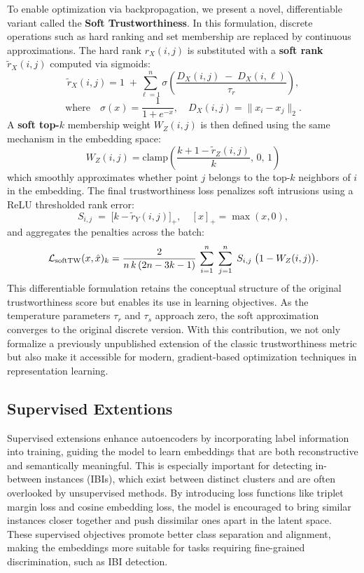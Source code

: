 To enable optimization via backpropagation, we present a novel, differentiable variant called the \textbf{Soft Trustworthiness}. In this formulation, discrete operations such as hard ranking and set membership are replaced by continuous approximations. The hard rank $r_X(i,j)$ is substituted with a \textbf{soft rank} $\widetilde r_X(i,j)$ computed via sigmoids:
$$
\widetilde r_X(i,j)
= 1 \;+\!
\sum_{\ell=1}^{n}
\sigma\!\left(\frac{D_X(i,j)\;-\;D_X(i,\ell)}{\tau_r}\right),
$$
$$
\text{where}
\quad
\sigma(x)=\frac{1}{1+e^{-x}}
,
\quad
D_X(i,j) = \|x_i - x_j\|_2
.
$$
A \textbf{soft top-$k$} membership weight $W_Z(i,j)$ is then defined using the same mechanism in the embedding space:
$$
W_Z(i,j) = \text{clamp}\left(\frac{k+1 - \widetilde r_Z(i,j)}{k},\, 0,\, 1\right)
$$
which smoothly approximates whether point $j$ belongs to the top-$k$ neighbors of $i$ in the embedding.
The final trustworthiness loss penalizes soft intrusions using a ReLU thresholded rank error:
$$
S_{i,j} \;=\;\bigl[k-\widetilde r_Y(i,j)\bigr]_{+},
\quad
[x]_{+}=\max(x,0),
$$
and aggregates the penalties across the batch:
$$
\mathcal L_{\rm softTW}(x, \hat{x})_k
= \frac{2}{n\,k\,(2n-3k-1)}\,
\sum_{i=1}^{n}\;\sum_{j=1}^{n}
\;S_{i,j}\;\bigl(1 - W_Z(i,j)\bigr).
$$
This differentiable formulation retains the conceptual structure of the original trustworthiness score but enables its use in learning objectives. As the temperature parameters $\tau_r$ and $\tau_s$ approach zero, the soft approximation converges to the original discrete version. With this contribution, we not only formalize a previously unpublished extension of the classic trustworthiness metric but also make it accessible for modern, gradient-based optimization techniques in representation learning.

\subsection{Supervised Extentions}

Supervised extensions enhance autoencoders by incorporating label information into training, guiding the model to learn embeddings that are both reconstructive and semantically meaningful. This is especially important for detecting in-between instances (IBIs), which exist between distinct clusters and are often overlooked by unsupervised methods. By introducing loss functions like triplet margin loss and cosine embedding loss, the model is encouraged to bring similar instances closer together and push dissimilar ones apart in the latent space. These supervised objectives promote better class separation and alignment, making the embeddings more suitable for tasks requiring fine-grained discrimination, such as IBI detection.

